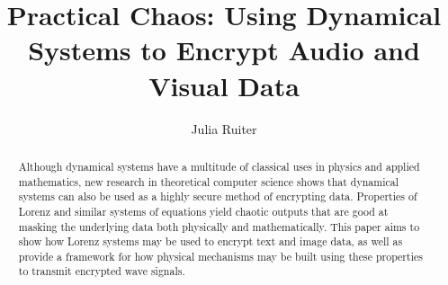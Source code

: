 \documentclass{scrippsthesis}
\title{Practical Chaos:  Using Dynamical Systems to Encrypt Audio and Visual Data}
\author{Julia Ruiter}
\theoremstyle{definition}
\theoremstyle{remark}
\begin{document}

\frontmatter

\maketitle %
%
%
%
\begin{abstract} 
Although dynamical systems have a multitude of classical uses in physics and applied mathematics, new research in theoretical computer science shows that dynamical systems can also be used as a highly secure method of encrypting data.  Properties of Lorenz and similar systems of equations yield chaotic outputs that are good at masking the underlying data both physically and mathematically.  This paper aims to show how Lorenz systems may be used to encrypt text and image data, as well as provide a framework for how physical mechanisms may be built using these properties to transmit encrypted wave signals.
\end{abstract}

\tableofcontents
\listoffigures




\mainmatter










%





\backmatter

%
\nocite{*} %


\end{document}
